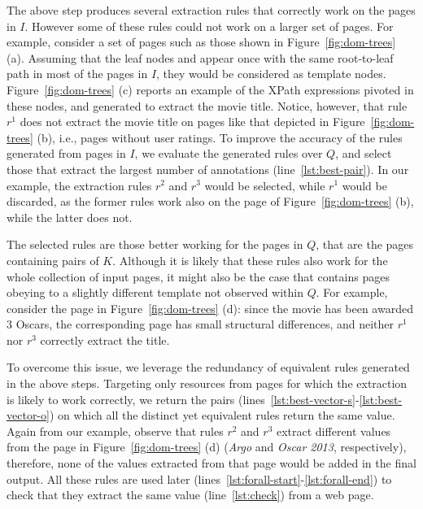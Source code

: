 The above step produces several extraction rules that correctly work on the pages 
in $I$. However some of these rules could not work on a larger set of pages. 
For example, consider a set of pages such as those shown in Figure~\ref{fig:dom-trees} (a). Assuming that the leaf nodes {} and {} appear once with the same root-to-leaf path in most of the pages in $I$, they would be considered as template nodes. Figure~\ref{fig:dom-trees} (c) reports an example of the XPath expressions pivoted in these nodes, and generated to extract the movie title.
%
%
Notice, however, that rule $r^1$ does not extract the movie title on pages like that depicted in Figure~\ref{fig:dom-trees} (b), i.e., pages without user ratings.
To improve the accuracy of the rules generated from pages in $I$, we evaluate the generated rules over $Q$, and select those that extract the largest number of annotations (line~\ref{lst:best-pair}). In our example, the extraction rules $r^2$ and $r^3$ would be selected, while $r^1$ would be discarded, as the former rules work also on the page of Figure~\ref{fig:dom-trees} (b), while the latter does not. 

The selected rules are those better working for the pages in $Q$, that are the pages containing pairs of $K$. Although it is likely that these rules also work for the whole collection of input pages, it might also be the case that {\allpages} contains pages obeying to a slightly different template not observed within $Q$. For example, consider the page in Figure~\ref{fig:dom-trees} (d): since the movie has been awarded 3 Oscars, the corresponding page has small structural differences, and neither $r^1$ nor $r^3$ correctly extract the title. 


To overcome this issue, we leverage the redundancy of equivalent rules generated in the above steps. Targeting only resources from pages for which the extraction is likely to work correctly, we return the pairs (lines~\ref{lst:best-vector-s}-\ref{lst:best-vector-o}) on which all the distinct yet equivalent rules return the same value. Again from our example, observe that rules $r^2$ and $r^3$ extract different values from the page in Figure~\ref{fig:dom-trees} (d) ({\em Argo} and {\em Oscar 2013}, respectively), therefore, none of the values extracted from that page would be added in the final output. 
All these rules are used later (lines~\ref{lst:forall-start}-\ref{lst:forall-end}) to check that they extract the same value (line~\ref{lst:check}) from a web page.


